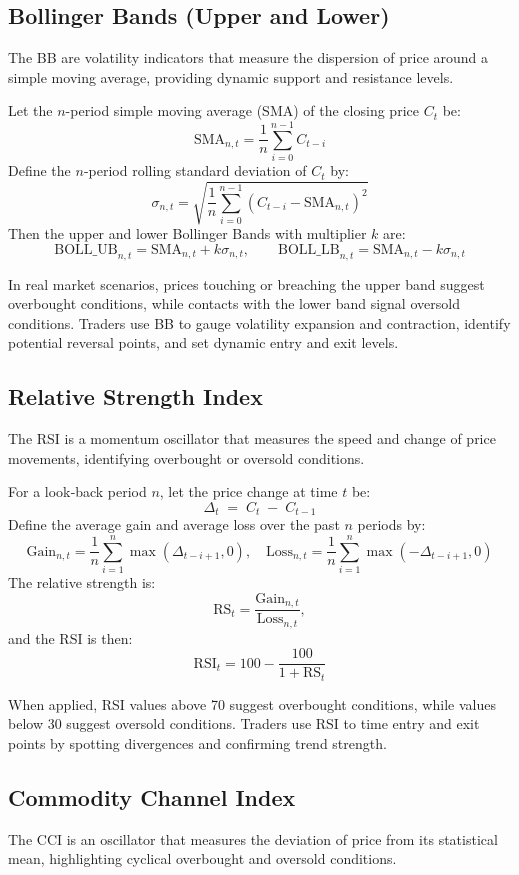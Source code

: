 \subsection{Bollinger Bands (Upper and Lower)}
The \gls{BB} are volatility indicators that measure the dispersion of price around a simple moving average, providing dynamic support and resistance levels.

Let the \(n\)-period simple moving average (SMA) of the closing price \(C_t\) be:
\[\mathrm{SMA}_{n,t} = \frac{1}{n} \sum_{i=0}^{n-1} C_{t-i}\]
Define the \(n\)-period rolling standard deviation of \(C_t\) by:
\[\sigma_{n,t} = \sqrt{\frac{1}{n} \sum_{i=0}^{n-1} (C_{t-i} - \mathrm{SMA}_{n,t})^2}\]
Then the upper and lower Bollinger Bands with multiplier \(k\) are:
\[\mathrm{BOLL\_UB}_{n,t} = \mathrm{SMA}_{n,t} + k \sigma_{n,t}, \qquad \mathrm{BOLL\_LB}_{n,t} = \mathrm{SMA}_{n,t} - k \sigma_{n,t}\]

In real market scenarios, prices touching or breaching the upper band suggest overbought conditions, while contacts with the lower band signal oversold conditions. Traders use \gls{BB} to gauge volatility expansion and contraction, identify potential reversal points, and set dynamic entry and exit levels.

\subsection{Relative Strength Index}
The \gls{RSI} is a momentum oscillator that measures the speed and change of price movements, identifying overbought or oversold conditions.

For a look‐back period \(n\), let the price change at time \(t\) be:
\[\Delta_t \;=\; C_t \;-\; C_{t-1}\]
Define the average gain and average loss over the past \(n\) periods by:
\[\mathrm{Gain}_{n,t} = \frac{1}{n} \sum_{i=1}^{n} \max(\Delta_{t-i+1},0), \quad \mathrm{Loss}_{n,t} = \frac{1}{n} \sum_{i=1}^{n} \max(-\Delta_{t-i+1},0)\]
The relative strength is:
\[\mathrm{RS}_t = \frac{\mathrm{Gain}_{n,t}}{\mathrm{Loss}_{n,t}},\]
and the RSI is then:
\[\mathrm{RSI}_t = 100 - \frac{100}{1 + \mathrm{RS}_t}\]

When applied, \gls{RSI} values above 70 suggest overbought conditions, while values below 30 suggest oversold conditions. Traders use \gls{RSI} to time entry and exit points by spotting divergences and confirming trend strength.

\subsection{Commodity Channel Index}
The \gls{CCI} is an oscillator that measures the deviation of price from its statistical mean, highlighting cyclical overbought and oversold conditions.

